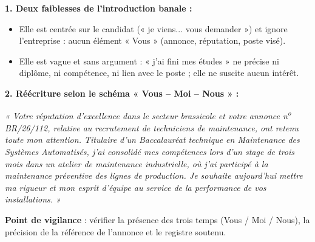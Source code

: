 \documentclass[11pt]{article}
\begin{document}
\begin{corrige}
\textbf{1. Deux faiblesses de l'introduction banale :}
\begin{itemize}
\item Elle est centrée sur le candidat (« je viens... vous demander ») et ignore l'entreprise : aucun élément « Vous » (annonce, réputation, poste visé).
\item Elle est vague et sans argument : « j'ai fini mes études » ne précise ni diplôme, ni compétence, ni lien avec le poste ; elle ne suscite aucun intérêt.
\end{itemize}
\textbf{2. Réécriture selon le schéma « Vous -- Moi -- Nous » :}
\begin{center}
\emph{« Votre réputation d'excellence dans le secteur brassicole et votre annonce n\textsuperscript{o} BR/26/112, relative au recrutement de techniciens de maintenance, ont retenu toute mon attention. Titulaire d'un Baccalauréat technique en Maintenance des Systèmes Automatisés, j'ai consolidé mes compétences lors d'un stage de trois mois dans un atelier de maintenance industrielle, où j'ai participé à la maintenance préventive des lignes de production. Je souhaite aujourd'hui mettre ma rigueur et mon esprit d'équipe au service de la performance de vos installations. »}
\end{center}
\textbf{Point de vigilance} : vérifier la présence des trois temps (Vous / Moi / Nous), la précision de la référence de l'annonce et le registre soutenu.
\end{corrige}
\end{document}
